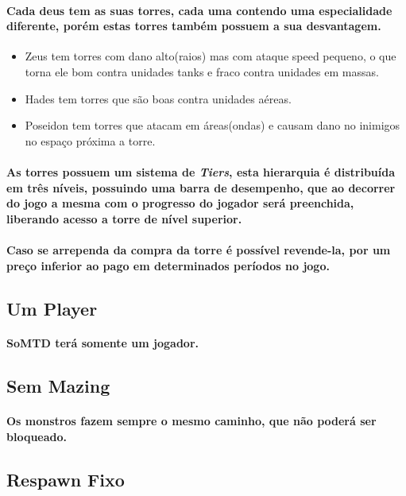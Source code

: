 \documentclass[11pt]{article} %
\begin{document}
\paragraph{Cada deus tem as suas torres, cada uma contendo uma especialidade diferente, porém estas torres também possuem a sua desvantagem.}
\begin{itemize}
\item Zeus tem torres com dano alto(raios) mas com ataque speed pequeno, o que torna ele bom contra unidades tanks e fraco contra unidades em massas.
\item Hades tem torres que são boas contra unidades aéreas.
\item Poseidon tem torres que atacam em áreas(ondas) e causam dano no inimigos no espaço próxima a torre.
\end{itemize}
\paragraph{As torres possuem um sistema de \textit{Tiers}, esta hierarquia é distribuída em três níveis, possuindo uma barra de desempenho, que ao decorrer do jogo a mesma com o progresso do jogador será preenchida, liberando acesso a torre de nível superior.}

\paragraph{Caso se arrependa da compra da torre é possível revende-la, por um preço inferior ao pago em determinados períodos no jogo.}

\subsection{Um Player}
\paragraph{SoMTD terá somente um jogador.}

\subsection{Sem Mazing}
\paragraph{Os monstros fazem sempre o mesmo caminho, que não poderá ser bloqueado.}

\subsection{Respawn Fixo}
\end{document}
